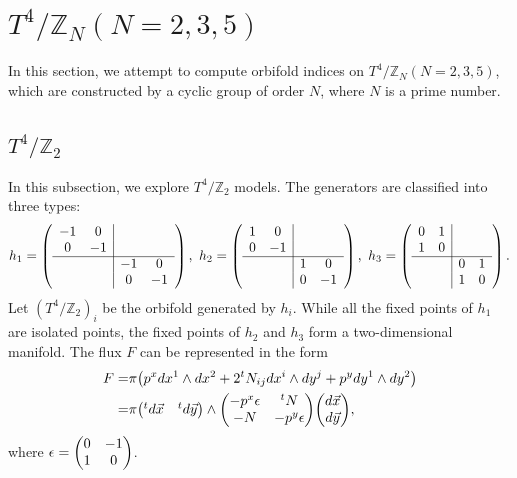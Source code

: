 \documentclass[11pt]{article}
\begin{document}
\section{$T^4/\mathbb{Z}_N(N=2,3,5)$}
\label{T4ZN}
In this section, we attempt to compute orbifold indices on $T^4/\mathbb{Z}_N(N=2,3,5)$, which are constructed by a cyclic group of order $N$, where $N$ is a prime number.


\subsection{$T^4/\mathbb{Z}_2$}
In this subsection, we explore $T^4/\mathbb{Z}_2$ models. The generators are classified into three types:
\begin{align}
    h_1= \left(\begin{array}{cc|cc}
-1 & 0 & & \\ 
0 & -1 && \\ \cline{1-4}
&&-1 & 0 \\
&& 0 & -1  
\end{array}\right),~h_2=\left(\begin{array}{cc|cc}
1 & 0 & & \\ 
0 & -1 && \\ \cline{1-4}
&&1 & 0 \\
&& 0 & -1  
\end{array}\right),~h_3=\left(\begin{array}{cc|cc}
0 & 1 & & \\ 
1 & 0 && \\ \cline{1-4}
&&0 & 1 \\
&& 1 & 0  
\end{array}\right).
\end{align}
Let $(T^4/\mathbb{Z}_2)_i$ be the orbifold generated by $h_i$. 
While all the fixed points of $h_1$ are isolated points, the fixed points of $h_2$ and $h_3$ form a two-dimensional manifold. The flux $F$ can be represented in the form
\begin{align}
    F= & \pi\qty( p^x dx^{1} \wedge dx^2 + 2 {}^tN_{ij} dx^{i} \wedge dy^j + p^y dy^{1} \wedge dy^2) \nonumber \\
    =& \pi \mqty({}^t d\vec{x} & {}^t d\vec{y} ) \wedge \mqty( -p^x \epsilon & {}^tN \\-N & -p^y\epsilon ) \mqty(d\vec{x} \\  d\vec{y} ),
\end{align}
where $\epsilon=\mqty(0 & -1 \\ 1 & 0)$. 
\end{document}
